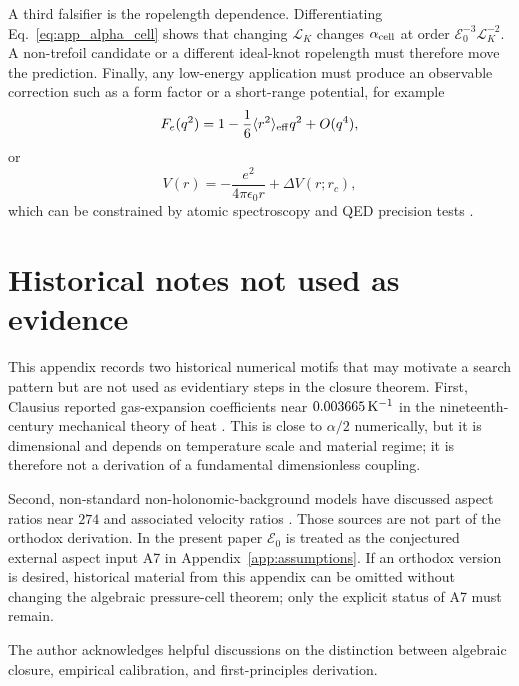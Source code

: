 \documentclass[aps,pra,preprint,longbibliography,nofootinbib]{revtex4-2}
\begin{document}
A third falsifier is the ropelength dependence.  Differentiating
Eq.~\eqref{eq:app_alpha_cell} shows that changing $\mathcal L_K$ changes
$\alpha_{\rm cell}$ at order $\mathcal E_0^{-3}\mathcal L_K^{-2}$.  A
non-trefoil candidate or a different ideal-knot ropelength must therefore
move the prediction.  Finally, any low-energy application must produce an
observable correction such as a form factor or a short-range potential,
for example
\begin{equation}
  F_e(q^2)=1-\frac{1}{6}\langle r^2\rangle_{\rm eff}q^2+O(q^4),
  \label{eq:app_form_factor}
\end{equation}
or
\begin{equation}
  V(r)=-\frac{e^2}{4\pi\epsilon_0 r}+\Delta V(r;r_c),
  \label{eq:app_potential_correction}
\end{equation}
which can be constrained by atomic spectroscopy and QED precision tests
\cite{Bethe1947,Karshenboim2005,PDG2022}.

\section{Historical notes not used as evidence}
\label{app:history}

This appendix records two historical numerical motifs that may motivate a
search pattern but are not used as evidentiary steps in the closure theorem.
First, Clausius reported gas-expansion coefficients near
$0.003665\,{\rm K}^{-1}$ in the nineteenth-century mechanical theory of heat
\cite{Clausius1867}.  This is close to $\alpha/2$ numerically, but it is
dimensional and depends on temperature scale and material regime; it is
therefore not a derivation of a fundamental dimensionless coupling.

Second, non-standard non-holonomic-background models have discussed aspect
ratios near $274$ and associated velocity ratios
\cite{RabounskiBorissova2007,OrosDiBartini2005}.  Those sources are not part
of the orthodox derivation.  In the present paper $\mathcal E_0$ is treated
as the conjectured external aspect input A7 in
Appendix~\ref{app:assumptions}.  If an orthodox version is desired,
historical material from this appendix can be omitted without changing the
algebraic pressure-cell theorem; only the explicit status of A7 must remain.

\begin{acknowledgments}
The author acknowledges helpful discussions on the distinction between
algebraic closure, empirical calibration, and first-principles
derivation.
\end{acknowledgments}
\end{document}

